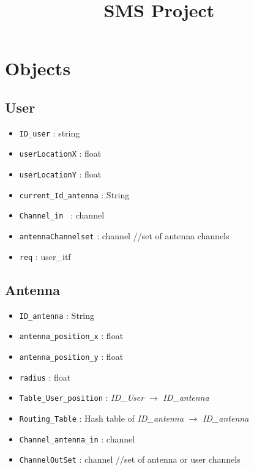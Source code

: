 \documentclass[a4paper,11pt]{article}
\title{\textbf{SMS Project}}
\date{}
\begin{document}
\maketitle

\section*{Objects}

\subsection*{User}
\begin{itemize}
  \item \texttt{ID\_user} : string
  \item \texttt{userLocationX} : float
  \item \texttt{userLocationY} : float
  \item \texttt{current\_Id\_antenna} : String
  \item \texttt{Channel\_in } : channel
  \item \texttt{antennaChannelset} : channel //set of antenna channels
  \item \texttt{req} : user\_itf 
\end{itemize}

\subsection*{Antenna}
\begin{itemize}
  \item \texttt{ID\_antenna} : String
  \item \texttt{antenna\_position\_x} : float
  \item \texttt{antenna\_position\_y} : float
  \item \texttt{radius} : float
  \item \texttt{Table\_User\_position} : \textit{ID\_User} $\rightarrow$ \textit{ID\_antenna}
  \item \texttt{Routing\_Table} : Hash table of \textit{ID\_antenna} $\rightarrow$ \textit{ID\_antenna}
  \item \texttt{Channel\_antenna\_in} : channel
  \item \texttt{ChannelOutSet} : channel //set of antenna or user channels
\end{itemize}

\end{document}
